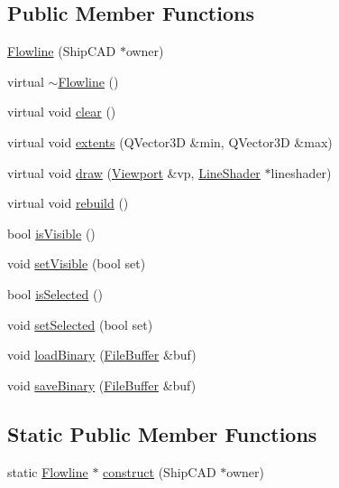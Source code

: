 \subsection*{Public Member Functions}
\begin{DoxyCompactItemize}
\item 
\hyperlink{classShipCAD_1_1Flowline_a736d6251cea3c3b290416a27159cad96}{Flowline} (Ship\-C\-A\-D $\ast$owner)
\item 
virtual \hyperlink{classShipCAD_1_1Flowline_a77555e4dc8db9f99b684ea60e2a1a88e}{$\sim$\-Flowline} ()
\item 
virtual void \hyperlink{classShipCAD_1_1Flowline_a4e138d0d75b46f8ecb62a60ecf3f4e64}{clear} ()
\item 
virtual void \hyperlink{classShipCAD_1_1Flowline_abc8e875663d00a645f6d462cde7bff79}{extents} (Q\-Vector3\-D \&min, Q\-Vector3\-D \&max)
\item 
virtual void \hyperlink{classShipCAD_1_1Flowline_afce93ff27acf72218b0e394b0d543a0d}{draw} (\hyperlink{classShipCAD_1_1Viewport}{Viewport} \&vp, \hyperlink{classShipCAD_1_1LineShader}{Line\-Shader} $\ast$lineshader)
\item 
virtual void \hyperlink{classShipCAD_1_1Flowline_a13e27605271592ba288ad9d0b6e2a8c1}{rebuild} ()
\item 
bool \hyperlink{classShipCAD_1_1Flowline_aaaf96bde2aff35bd302ebf4e784b6a04}{is\-Visible} ()
\item 
void \hyperlink{classShipCAD_1_1Flowline_ad6546bfd621882e9d5067c919e148871}{set\-Visible} (bool set)
\item 
bool \hyperlink{classShipCAD_1_1Flowline_af2daefa9893fef5c56b398d01be529af}{is\-Selected} ()
\item 
void \hyperlink{classShipCAD_1_1Flowline_af8205e548dba009fd1a169f0a841dde5}{set\-Selected} (bool set)
\item 
void \hyperlink{classShipCAD_1_1Flowline_ad852ac9d0cf1ec68ad7243c19aed6410}{load\-Binary} (\hyperlink{classShipCAD_1_1FileBuffer}{File\-Buffer} \&buf)
\item 
void \hyperlink{classShipCAD_1_1Flowline_ae36a33c0140e03676ccc1f90ceb53543}{save\-Binary} (\hyperlink{classShipCAD_1_1FileBuffer}{File\-Buffer} \&buf)
\end{DoxyCompactItemize}
\subsection*{Static Public Member Functions}
\begin{DoxyCompactItemize}
\item 
static \hyperlink{classShipCAD_1_1Flowline}{Flowline} $\ast$ \hyperlink{classShipCAD_1_1Flowline_aadb39af0ba334958a3596b464f81006b}{construct} (Ship\-C\-A\-D $\ast$owner)
\end{DoxyCompactItemize}
